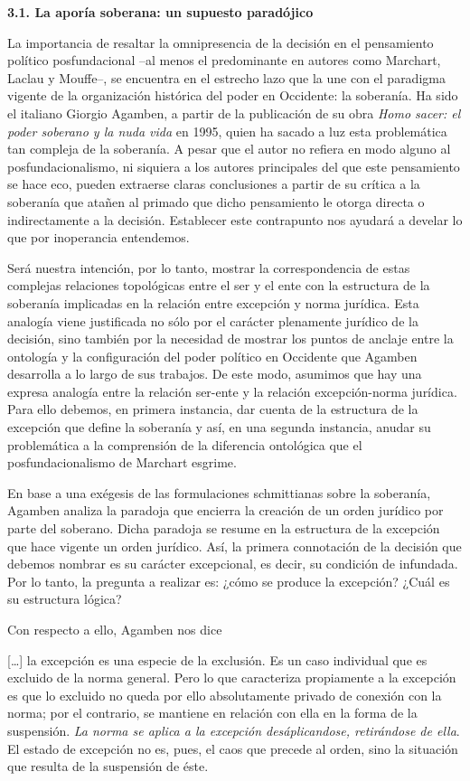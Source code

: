 \textbf{3.1. La aporía soberana: un supuesto paradójico}

La importancia de resaltar la omnipresencia de la decisión en el pensamiento político posfundacional --al menos el predominante en autores como Marchart, Laclau y Mouffe--, se encuentra en el estrecho lazo que la une con el paradigma vigente de la organización histórica del poder en Occidente: la soberanía. Ha sido el italiano Giorgio Agamben, a partir de la publicación de su obra \emph{Homo sacer: el poder soberano y la nuda vida} en 1995, quien ha sacado a luz esta problemática tan compleja de la soberanía. A pesar que el autor no refiera en modo alguno al posfundacionalismo, ni siquiera a los autores principales del que este pensamiento se hace eco, pueden extraerse claras conclusiones a partir de su crítica a la soberanía que atañen al primado que dicho pensamiento le otorga directa o indirectamente a la decisión. Establecer este contrapunto nos ayudará a develar lo que por inoperancia entendemos.

Será nuestra intención, por lo tanto, mostrar la correspondencia de estas complejas relaciones topológicas entre el ser y el ente con la estructura de la soberanía implicadas en la relación entre excepción y norma jurídica. Esta analogía viene justificada no sólo por el carácter plenamente jurídico de la decisión, sino también por la necesidad de mostrar los puntos de anclaje entre la ontología y la configuración del poder político en Occidente que Agamben desarrolla a lo largo de sus trabajos. De este modo, asumimos que hay una expresa analogía entre la relación ser-ente y la relación excepción-norma jurídica. Para ello debemos, en primera instancia, dar cuenta de la estructura de la excepción que define la soberanía y así, en una segunda instancia, anudar su problemática a la comprensión de la diferencia ontológica que el posfundacionalismo de Marchart esgrime.

En base a una exégesis de las formulaciones schmittianas sobre la soberanía, Agamben analiza la paradoja que encierra la creación de un orden jurídico por parte del soberano. Dicha paradoja se resume en la estructura de la excepción que hace vigente un orden jurídico. Así, la primera connotación de la decisión que debemos nombrar es su carácter excepcional, es decir, su condición de infundada. Por lo tanto, la pregunta a realizar es: ¿cómo se produce la excepción? ¿Cuál es su estructura lógica?

Con respecto a ello, Agamben nos dice

{[}\ldots{]} la excepción es una especie de la exclusión. Es un caso individual que es excluido de la norma general. Pero lo que caracteriza propiamente a la excepción es que lo excluido no queda por ello absolutamente privado de conexión con la norma; por el contrario, se mantiene en relación con ella en la forma de la suspensión. \emph{La norma se aplica a la excepción desáplicandose, retirándose de ella}. El estado de excepción no es, pues, el caos que precede al orden, sino la situación que resulta de la suspensión de éste.

